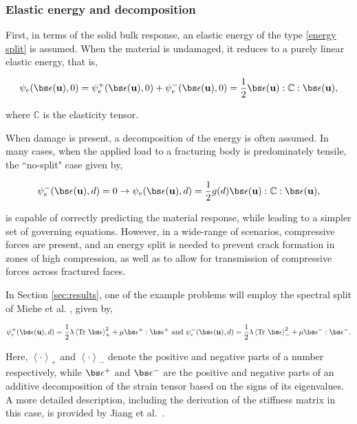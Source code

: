 \subsubsection{Elastic energy and decomposition}

First, in terms of the solid bulk response, an elastic energy of the type \eqref{energy split} is assumed. When the material is undamaged, it reduces to a purely linear elastic energy, that is,

\begin{equation}
    \psi_e(\bs\epsilon(\textbf{u}),0) = \psi_e^+(\bs\epsilon(\textbf{u}),0)+\psi_e^-(\bs\epsilon(\textbf{u}),0) = \dfrac{1}{2}\bs\epsilon(\textbf{u}) : \mathbb{C} : \bs\epsilon(\textbf{u}),
\end{equation}

\noindent where $\mathbb{C}$ is the elasticity tensor.

When damage is present, a decomposition of the energy is often assumed. In many cases, when the applied load to a fracturing body is predominately tensile, the ``no-split" case given by,

\begin{equation}
    \psi_e^-(\bs\epsilon(\textbf{u}),d)=0 \rightarrow \psi_e(\bs\epsilon(\textbf{u}),d) = \dfrac{1}{2}g(d)\bs\epsilon(\textbf{u}) : \mathbb{C} : \bs\epsilon(\textbf{u}),
\end{equation}

\noindent is capable of correctly predicting the material response, while leading to a simpler set of governing equations. However, in a wide-range of scenarios, compressive forces are present, and an energy split is needed to prevent crack formation in zones of high compression, as well as to allow for transmission of compressive forces across fractured faces. 

In Section \ref{sec:results}, one of the example problems will employ the spectral split of Miehe et al. \cite{miehe2010phase},  given by,

\begin{equation}
    \psi_e^+(\bs\epsilon(\textbf{u}),d) = \dfrac{1}{2}\lambda\left<\text{Tr }\bs\epsilon\right>_+^2+\mu\bs\epsilon^+:\bs\epsilon^+ \text{ and }  \psi_e^-(\bs\epsilon(\textbf{u}),d) = \dfrac{1}{2}\lambda\left<\text{Tr }\bs\epsilon\right>_-^2+\mu\bs\epsilon^-:\bs\epsilon^-.
\end{equation}

Here, $\left< \cdot \right>_+$ and $\left< \cdot \right>_-$ denote the positive and negative parts of a number respectively, while $\bs\epsilon^+$ and $\bs\epsilon^-$ are the positive and negative parts of an additive decomposition of the strain tensor based on the signs of its eigenvalues. A more detailed description, including the derivation of the stiffness matrix in this case, is provided by Jiang et al.\ \cite{jiang2020three}.

